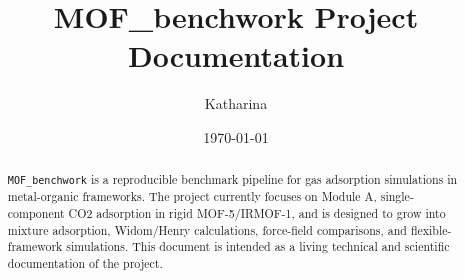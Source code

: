 \documentclass[11pt,a4paper]{article}
\title{MOF\_benchwork Project Documentation}
\author{Katharina}
\date{\today}
\begin{document}
\maketitle

\begin{abstract}
\texttt{MOF\_benchwork} is a reproducible benchmark pipeline for gas adsorption simulations in metal-organic frameworks.
The project currently focuses on Module A, single-component CO2 adsorption in rigid MOF-5/IRMOF-1, and is designed to grow into mixture adsorption, Widom/Henry calculations, force-field comparisons, and flexible-framework simulations.
This document is intended as a living technical and scientific documentation of the project.
\end{abstract}

\tableofcontents
\newpage













\end{document}
